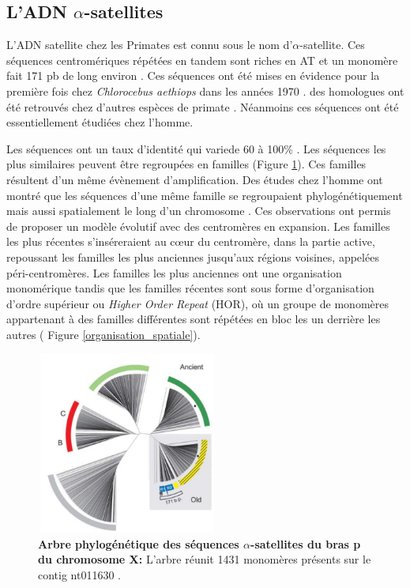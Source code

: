 \documentclass[12pt,a4paper]{article}
\begin{document}
\subsection{L'ADN $\alpha$-satellites}
L'ADN satellite chez les Primates est connu sous le nom d'$\alpha$-satellite. Ces séquences centromériques répétées en tandem sont riches en AT et un monomère fait 171 pb de long environ \cite{Willard1991}. Ces séquences ont été mises en évidence pour la première fois chez \textit{Chlorocebus aethiops} dans les années 1970 \cite{Kurnit1974}. des homologues ont été retrouvés chez d’autres espèces de primate \cite{Lee1997}. Néanmoins ces séquences ont été essentiellement étudiées chez l’homme.

Les séquences ont un taux d’identité qui variede  60 à 100\% \cite{Alexandrov2001}. Les séquences les plus similaires peuvent être regroupées en familles (Figure \ref{shepelev}). Ces familles résultent d'un même évènement d'amplification. Des études chez l'homme ont montré que les séquences d'une même famille se regroupaient phylogénétiquement mais aussi spatialement le long d'un chromosome \cite{Shepelev2009}. Ces observations ont permis de proposer un modèle évolutif avec des centromères en expansion. Les familles les plus récentes s’inséreraient au cœur du centromère, dans la partie active, repoussant les familles les plus anciennes jusqu'aux régions voisines, appelées péri-centromères. Les familles les plus anciennes ont une organisation monomérique tandis que les familles récentes sont sous forme d'organisation d'ordre supérieur ou \textit{Higher Order Repeat} (HOR), où un groupe de monomères appartenant à des familles différentes sont répétées en bloc les un derrière les autres ( Figure \ref{organisation_spatiale}).

\begin{figure}
	\center
		\includegraphics[height=6cm, width=6cm]{img/shepelev.png}
		\caption{\textbf{Arbre phylogénétique des séquences $\alpha$-satellites du bras p du chromosome X:} L’arbre réunit 1431 monomères présents sur le contig nt011630 \cite{Shepelev2009}.\label{shepelev}}
\end{figure}
\end{document}
